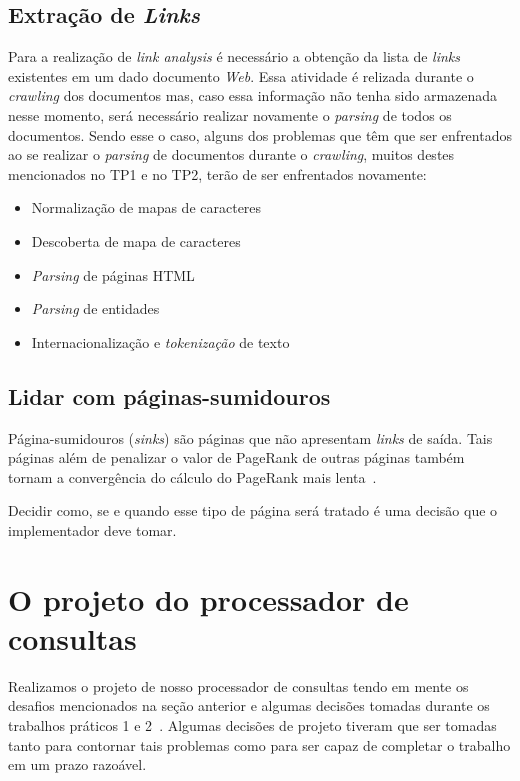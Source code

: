 \documentclass[10pt,twocolumn]{article}
\begin{document}
\subsection{Extração de \emph{Links}}

Para a realização de \emph{link analysis} é necessário a obtenção da
lista de \emph{links} existentes em um dado documento \emph{Web}.
Essa atividade é relizada durante o
\emph{crawling} dos documentos mas, caso essa informação não tenha sido
armazenada nesse momento, será necessário realizar novamente o
\emph{parsing} de todos os documentos. Sendo esse o caso, alguns dos
problemas que têm que ser enfrentados ao se realizar o \emph{parsing} de
documentos durante o \emph{crawling}, muitos destes mencionados no TP1 e no TP2, terão de ser
enfrentados novamente:
\begin{itemize}
\item Normalização de mapas de caracteres
\item Descoberta de mapa de caracteres
\item \emph{Parsing} de páginas HTML
\item \emph{Parsing} de entidades
\item Internacionalização e \emph{tokenização} de texto
\end{itemize}

\subsection{Lidar com páginas-sumidouros}

Página-sumidouros (\emph{sinks}) são páginas que não apresentam
\emph{links} de saída. Tais páginas além de penalizar o valor de
PageRank de outras páginas também tornam a convergência do cálculo do
PageRank mais lenta~\cite{haveliwala99efficient, page98pagerank}.

Decidir como, se e quando esse tipo de página será tratado é uma decisão
que o implementador deve tomar.


\section{O projeto do processador de consultas}\label{sec:projeto}

Realizamos o projeto de nosso processador de consultas tendo em mente os desafios
mencionados na seção anterior e algumas decisões tomadas durante os
trabalhos práticos 1 e 2~\cite{tp1,tp2}. Algumas decisões de projeto tiveram que
ser tomadas tanto para contornar tais problemas como para ser capaz de
completar o trabalho em um prazo razoável.
\end{document}
